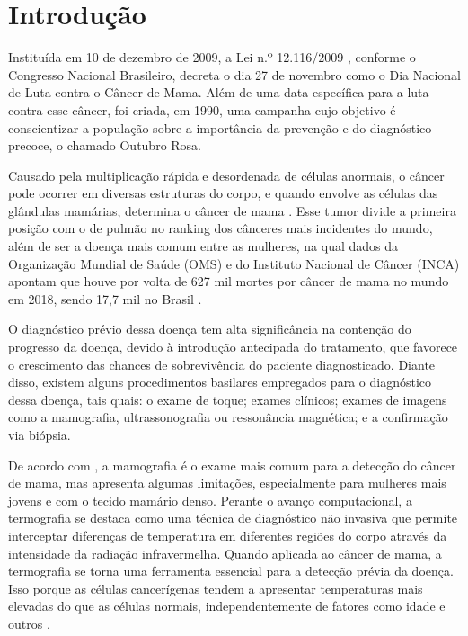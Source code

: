 
\section{\esp Introdução}

Instituída em 10 de dezembro de 2009, a Lei n.º 12.116/2009 , conforme o Congresso Nacional Brasileiro, decreta o dia 27 de novembro como o Dia Nacional de Luta contra o Câncer de Mama. Além de uma data específica para a luta contra esse câncer, foi criada, em 1990, uma campanha cujo objetivo é conscientizar a população sobre a importância da prevenção e do diagnóstico precoce, o chamado Outubro Rosa.

Causado pela multiplicação rápida e desordenada de células anormais, o câncer pode ocorrer em diversas estruturas do corpo, e quando envolve as células das glândulas mamárias, determina o câncer de mama \cite{incaoquee}. Esse tumor divide a primeira posição com o de pulmão no ranking dos cânceres mais incidentes do mundo, além de ser a doença mais comum entre as mulheres, na qual dados da Organização Mundial de Saúde (OMS) e do Instituto Nacional de Câncer (INCA) apontam que houve por volta de 627 mil mortes por câncer de mama no mundo em 2018, sendo 17,7 mil no Brasil \cite{boletimepidemiologico}.

O diagnóstico prévio dessa doença tem alta significância na contenção do progresso da doença, devido à introdução antecipada do tratamento, que favorece o crescimento das chances de sobrevivência do paciente diagnosticado. Diante disso, existem alguns procedimentos basilares empregados para o diagnóstico dessa doença, tais quais: o exame de toque; exames clínicos; exames de imagens como a mamografia, ultrassonografia ou ressonância magnética; e a confirmação via biópsia.

De acordo com , a mamografia é o exame mais comum para a detecção do câncer de mama, mas apresenta algumas limitações, especialmente para mulheres mais jovens e com o tecido mamário denso. Perante o avanço computacional, a termografia se destaca como uma técnica de diagnóstico não invasiva que permite interceptar diferenças de temperatura em diferentes regiões do corpo através da intensidade da radiação infravermelha. Quando aplicada ao câncer de mama, a termografia se torna uma ferramenta essencial para a detecção prévia da doença. Isso porque as células cancerígenas tendem a apresentar temperaturas mais elevadas do que as células normais, independentemente de fatores como idade e outros \cite{leles}.

